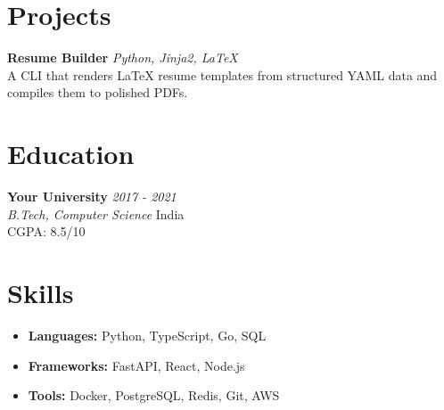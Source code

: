 \documentclass[11pt,a4paper]{article}
\newcommand{\entry}[4]{%
  \noindent\textbf{#1} \hfill \textit{#2}\\[1pt]
  \textit{#3} \hfill #4\\[2pt]
}
\begin{document}
\section{Projects}
\noindent\textbf{Resume Builder} \; \href{https://github.com/your-handle/resume-builder}{\faLink}\hfill \textit{Python, Jinja2, LaTeX}\\[2pt]
A CLI that renders LaTeX resume templates from structured YAML data and compiles them to polished PDFs.

\vspace{4pt}

\section{Education}
\entry{Your University}{2017 - 2021}{B.Tech, Computer Science}{India}
CGPA: 8.5/10\\[2pt]\vspace{2pt}

\section{Skills}
\begin{itemize}[label={}]
  \item \textbf{Languages:} Python, TypeScript, Go, SQL
  \item \textbf{Frameworks:} FastAPI, React, Node.js
  \item \textbf{Tools:} Docker, PostgreSQL, Redis, Git, AWS
\end{itemize}
\end{document}
